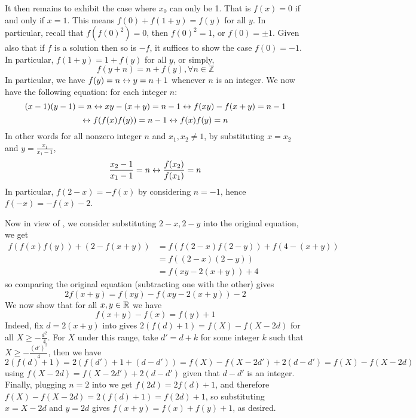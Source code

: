 \documentclass[11pt,a4paper]{article}
\begin{document}
\begin{enumerate}
	It then remains to exhibit the case where $x_0$ can only be 1. 
	That is $f(x)=0$ if and only if $x = 1$. 
	This means $f(0) + f(1 + y) = f(y)$ for all $y$. 
	In particular, recall that $f(f(0)^2) = 0$, then $f(0)^2 = 1$, or $f(0)=\pm 1$. 
	Given also that if $f$ is a solution then so is $-f$, 
	it suffices to show the case $f(0) = -1$. 
	In particular, $f(1 + y) = 1 + f(y)$ for all $y$, 
	or simply, 
	\begin{equation}\label{eq:a6_1}
		f(y + n) = n + f(y), \forall n\in \mathbb{Z}
	\end{equation}
    In particular, we have $f(y) = n \leftrightarrow y = n + 1$ whenever $n$ is an integer. 
    We now have the following equation: for each integer $n$: 
    \[
    (x - 1)(y - 1) = n
    \leftrightarrow xy - (x + y) = n - 1
    \leftrightarrow f(xy) - f(x + y) = n - 1
    \]\[
    \leftrightarrow f(f(x)f(y)) = n - 1
    \leftrightarrow f(x)f(y) = n
    \]
    In other words for all nonzero integer $n$ and $x_1, x_2\neq 1$, 
    by substituting $x = x_2$ and $y = \frac{x_1}{x_1 - 1}$, 
    \begin{equation}\label{eq:a6_2}
    	\frac{x_2-1}{x_1-1} = n
    	\leftrightarrow \frac{f(x_2)}{f(x_1)} = n
    \end{equation}
    In particular, $f(2 - x) = -f(x)$ by considering $n = -1$, hence $f(-x) = -f(x)-2$. 
    
    Now in view of , we consider 
    substituting $2-x, 2-y$ into the original equation, we get 
    \begin{align}
    	f(f(x)f(y))  + (2 - f(x + y))
    	&=f(f(2 - x)f(2 - y)) + f(4 - (x + y))
    	\nonumber\\
    	&=f((2 - x)(2 - y))
    	\nonumber\\
    	&=f(xy - 2(x + y)) + 4
    \end{align}
    so comparing the original equation (subtracting one with the other) gives 
    \begin{equation}\label{eq:a6_4}
    2f(x + y) = f(xy) - f(xy - 2(x + y)) - 2
    \end{equation}
    We now show that for all $x, y\in\mathbb{R}$ we have 
    \begin{equation}\label{eq:a6_5}
    	f(x + y) - f(x) = f(y) + 1
    \end{equation}
    Indeed, fix $d = 2(x + y)$ into  gives 
    $2(f(d) + 1) = f(X) - f(X - 2d)$ for all $X\ge -\frac{d^2}{4}$. 
    For $X$ under this range, take $d' = d + k$ for some integer $k$ such that 
    $X \ge - \frac{(d')^2}{4}$, then we have 
    \[
    2(f(d) + 1)
    =2(f(d') + 1 + (d - d'))
    =f(X) - f(X - 2d') + 2(d - d')
    =f(X) - f(X - 2d)
    \]
    using $f(X - 2d) = f(X - 2d') + 2(d - d')$ given that $d - d'$ is an integer. 
    Finally, plugging $n = 2$ into  we get $f(2d) = 2f(d) + 1$, 
    and therefore 
    $f(X) - f(X - 2d) = 2(f(d) + 1) = f(2d) + 1$, so substituting $x = X-2d$ and $y=2d$ gives 
    $f(x + y) = f(x) + f(y) + 1$, as desired. 
    

\end{enumerate}
\end{document}
